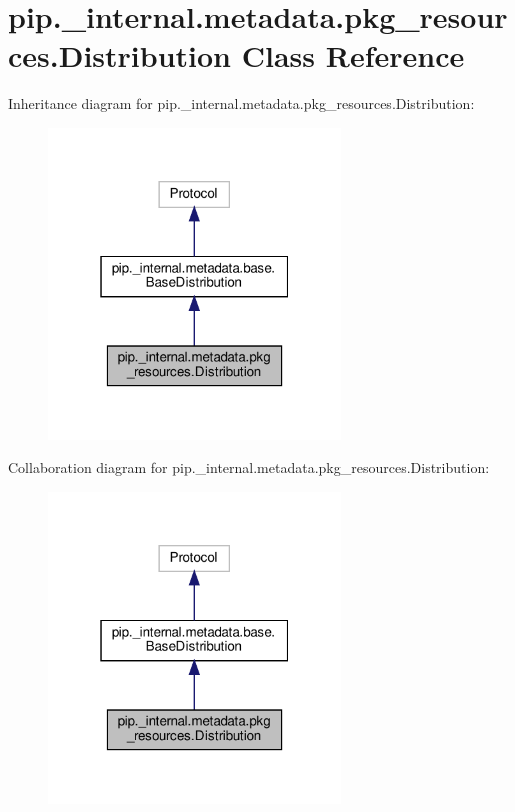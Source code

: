 \hypertarget{classpip_1_1__internal_1_1metadata_1_1pkg__resources_1_1Distribution}{}\section{pip.\+\_\+internal.\+metadata.\+pkg\+\_\+resources.\+Distribution Class Reference}
\label{classpip_1_1__internal_1_1metadata_1_1pkg__resources_1_1Distribution}


Inheritance diagram for pip.\+\_\+internal.\+metadata.\+pkg\+\_\+resources.\+Distribution\+:
\nopagebreak
\begin{figure}[H]
\begin{center}
\leavevmode
\includegraphics[width=220pt]{classpip_1_1__internal_1_1metadata_1_1pkg__resources_1_1Distribution__inherit__graph}
\end{center}
\end{figure}


Collaboration diagram for pip.\+\_\+internal.\+metadata.\+pkg\+\_\+resources.\+Distribution\+:
\nopagebreak
\begin{figure}[H]
\begin{center}
\leavevmode
\includegraphics[width=220pt]{classpip_1_1__internal_1_1metadata_1_1pkg__resources_1_1Distribution__coll__graph}
\end{center}
\end{figure}
